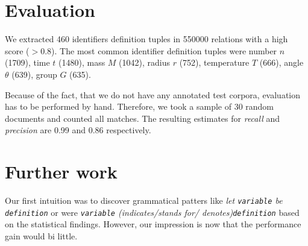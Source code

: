 \documentclass[runningheads]{llncs}
\begin{document}
\section{Evaluation}
We extracted 460 identifiers definition tuples in 550000 relations with a
high score ($>0.8$). The most common identifier definition tuples were 
number $n$ (1709), time $t$	(1480), mass $M$ (1042), radius $r$ (752), temperature	$T$	(666), angle $\theta$ (639), group $G$ (635).
%

Because of the fact, that we do not have any annotated test corpora,
evaluation has to be performed by hand. Therefore, we took a sample of 30
random documents and counted all matches. The resulting estimates for
\emph{recall} and \emph{precision} are 0.99 and 0.86 respectively.



\section{Further work}
Our first intuition was to discover grammatical patters like \emph{let \texttt{variable} be \texttt{definition}} or were \emph{\texttt{variable} (indicates/stands for/ denotes)\texttt{definition}} based on the statistical findings. However, our impression is now that the performance gain would bi little.
\end{document}

